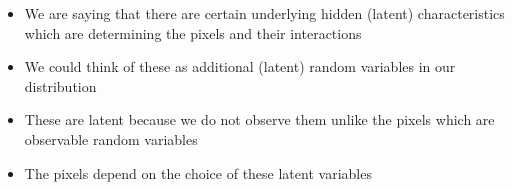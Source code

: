 \begin{frame}
\begin{columns}
\begin{overlayarea}{\textwidth}{\textheight}
\begin{itemize}
				\item<2-> We are saying that there are certain underlying hidden (latent) characteristics which are determining the pixels and their interactions
				\item<3-> We could think of these as additional (latent) random variables in our distribution
				\item<6-> These are latent because we do not observe them unlike the pixels which are observable random variables
				\item<7-> The pixels depend on the choice of these latent variables
			\end{itemize}
		\end{overlayarea}
	\end{columns}
\end{frame}


\begin{frame}[shrink=5]
	\begin{columns}
		\begin{overlayarea}{\textwidth}{\textheight}
			\vspace{1cm}

\end{overlayarea}
\end{columns}
\end{frame}
